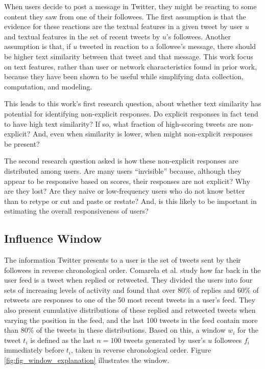 When users decide to post a message in Twitter, they might be reacting to some content they saw from one of their followees. The first assumption is that the evidence for these reactions are the textual features in a given tweet by user $u$ and textual features in the set of recent tweets by $u$'s followees. Another assumption is that, if $u$ tweeted in reaction to a followee's message, there should be higher text similarity between that tweet and that message. This work focus on text features, rather than user or network characteristics found in prior work, because they have been shown to be useful while simplifying data collection, computation, and modeling.

This leads to this work's first research question, about whether text similarity has potential for identifying non-explicit responses.
Do explicit responses in fact tend to have high text similarity? If so, what fraction of high-scoring tweets are non-explicit?  And, even when similarity is lower, when might non-explicit responses be present?

The second research question asked is how these non-explicit responses are distributed among users.  Are many users ``invisible'' because, although they appear to be responsive based on scores, their responses are not explicit?  Why are they lost?  Are they naive or low-frequency users who do not know better than to retype or cut and paste or restate? And, is this likely to be important in estimating the overall responsiveness of users?

\subsection{Influence Window}

The information Twitter presents to a user is the set of tweets sent by their followees in reverse chronological order. Comarela et al. \cite{Comarela2012} study how far back in the user feed is a tweet when replied or retweeted. They divided the users into four sets of increasing levels of activity and found that over 80\% of replies and 60\% of retweets are responses to one of the 50 most recent tweets in a user's feed. They also present cumulative distributions of these replied and retweeted tweets when varying the position in the feed, and the last 100 tweets in the feed contain more than 80\% of the tweets in these distributions.  
Based on this, a window $w_i$ for the tweet $t_i$ is defined as the last $n=100$ tweets generated by user's $u$ followees $f_i$ immediately before $t_i$, taken in reverse chronological order.
Figure \ref{fig:fig_window_explanation} illustrates the window. 

